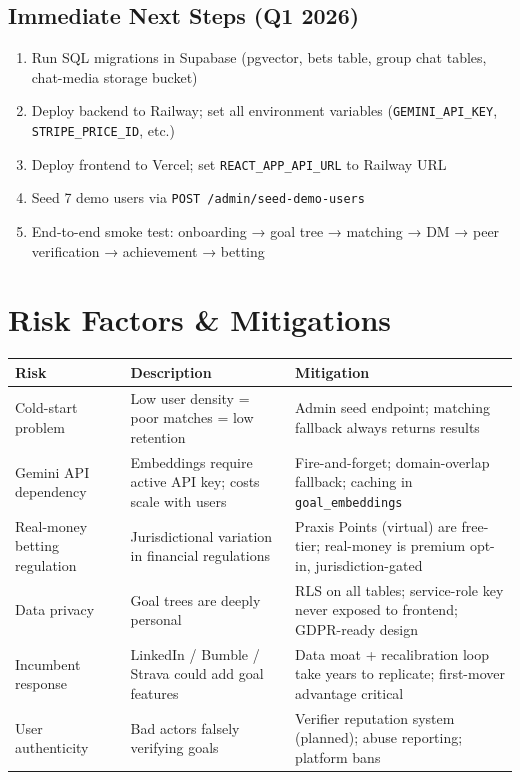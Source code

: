 \documentclass[11pt,a4paper]{article}
\begin{document}
\subsection{Immediate Next Steps (Q1 2026)}

\begin{enumerate}
  \item Run SQL migrations in Supabase (pgvector, bets table, group chat tables, chat-media storage bucket)
  \item Deploy backend to Railway; set all environment variables (\texttt{GEMINI\_API\_KEY}, \texttt{STRIPE\_PRICE\_ID}, etc.)
  \item Deploy frontend to Vercel; set \texttt{REACT\_APP\_API\_URL} to Railway URL
  \item Seed 7 demo users via \texttt{POST /admin/seed-demo-users}
  \item End-to-end smoke test: onboarding → goal tree → matching → DM → peer verification → achievement → betting
\end{enumerate}

\section{Risk Factors \& Mitigations}

\begin{center}
\begin{tabularx}{\linewidth}{lXX}
\toprule
\textbf{Risk} & \textbf{Description} & \textbf{Mitigation} \\
\midrule
Cold-start problem & Low user density = poor matches = low retention & Admin seed endpoint; matching fallback always returns results \\
Gemini API dependency & Embeddings require active API key; costs scale with users & Fire-and-forget; domain-overlap fallback; caching in \texttt{goal\_embeddings} \\
Real-money betting regulation & Jurisdictional variation in financial regulations & Praxis Points (virtual) are free-tier; real-money is premium opt-in, jurisdiction-gated \\
Data privacy & Goal trees are deeply personal & RLS on all tables; service-role key never exposed to frontend; GDPR-ready design \\
Incumbent response & LinkedIn / Bumble / Strava could add goal features & Data moat + recalibration loop take years to replicate; first-mover advantage critical \\
User authenticity & Bad actors falsely verifying goals & Verifier reputation system (planned); abuse reporting; platform bans \\
\bottomrule
\end{tabularx}
\end{center}
\end{document}
